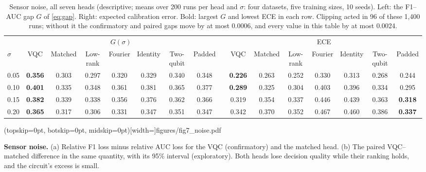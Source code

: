 \documentclass{ieeeaccess}
\newcommand{\vqc}{VQC}
\newcommand{\widecap}[1]{\parbox[t]{0.87\textwidth}{#1}}
\begin{document}
\begin{table}[t]
\caption{Sensor noise, all seven heads (descriptive; means over 200 runs per head and $\sigma$: four datasets, five training sizes, 10 seeds). Left: the F1--AUC gap $G$ of \eqref{eq:gap}. Right: expected calibration error. Bold: largest $G$ and lowest ECE in each row. Clipping acted in 96 of these 1,400 runs; without it the confirmatory and paired gaps move by at most 0.0006, and every value in this table by at most 0.0024.}
\label{tab:noise}
\centering
\setlength{\tabcolsep}{4pt}
\footnotesize
\begin{tabular}{@{}l ccccccc c ccccccc@{}}
\toprule
 & \multicolumn{7}{c}{$G(\sigma)$} & & \multicolumn{7}{c}{ECE}\\
\cmidrule{2-8}\cmidrule{10-16}
$\sigma$ & \vqc{} & Matched & Low-rank & Fourier & Identity & Two-qubit & Padded & & \vqc{} & Matched & Low-rank & Fourier & Identity & Two-qubit & Padded\\
\midrule
0.05 & \textbf{0.356} & 0.303 & 0.297 & 0.320 & 0.329 & 0.340 & 0.348 & & \textbf{0.226} & 0.263 & 0.252 & 0.330 & 0.313 & 0.268 & 0.244\\
0.10 & \textbf{0.401} & 0.335 & 0.348 & 0.361 & 0.381 & 0.365 & 0.377 & & \textbf{0.289} & 0.325 & 0.304 & 0.403 & 0.396 & 0.334 & 0.295\\
0.15 & \textbf{0.382} & 0.339 & 0.338 & 0.356 & 0.376 & 0.362 & 0.366 & & 0.319 & 0.354 & 0.337 & 0.446 & 0.439 & 0.363 & \textbf{0.318}\\
0.20 & \textbf{0.365} & 0.317 & 0.306 & 0.331 & 0.347 & 0.351 & 0.347 & & 0.342 & 0.370 & 0.352 & 0.467 & 0.460 & 0.386 & \textbf{0.337}\\
\bottomrule
\end{tabular}
\end{table}

\Figure[t!](topskip=0pt, botskip=0pt, midskip=0pt)[width=\textwidth]{figures/fig7_noise.pdf}
{\widecap{\textbf{Sensor noise.} (a) Relative F1 loss minus relative AUC loss for the \vqc{} (confirmatory) and the matched head. (b) The paired \vqc{}--matched difference in the same quantity, with its 95\% interval (exploratory). Both heads lose decision quality while their ranking holds, and the circuit's excess is small.}\label{fig:noise}}
\end{document}
